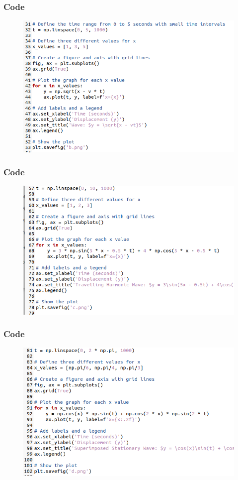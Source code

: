 \documentclass{beamer}
\begin{document}
\begin{frame}
\frametitle{Code}
\begin{figure}[ht]
                        \centering
                        \includegraphics[width=\columnwidth]{figs/2.png}
                        \label{fig:1.2}
\end{figure}
\end{frame}

\begin{frame}
\frametitle{Code}
\begin{figure}[ht]
                        \centering
                        \includegraphics[width=\columnwidth]{figs/3.png}
                        \label{fig:1.3}
\end{figure}
\end{frame}

\begin{frame}
\frametitle{Code}
\begin{figure}[ht]
                        \centering
                        \includegraphics[width=\columnwidth]{figs/4.png}
                        \label{fig:1.3}
\end{figure}
\end{frame}
\end{document}
